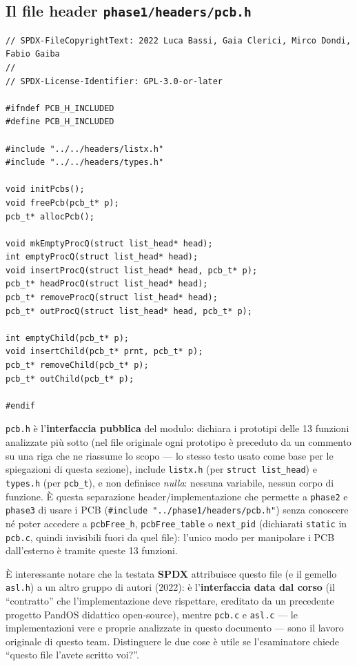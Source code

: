 \documentclass[11pt,a4paper]{article}
\newcommand{\code}[1]{\texttt{#1}}
\begin{document}
\subsection{Il file header \code{phase1/headers/pcb.h}}
\begin{lstlisting}
// SPDX-FileCopyrightText: 2022 Luca Bassi, Gaia Clerici, Mirco Dondi, Fabio Gaiba
//
// SPDX-License-Identifier: GPL-3.0-or-later

#ifndef PCB_H_INCLUDED
#define PCB_H_INCLUDED

#include "../../headers/listx.h"
#include "../../headers/types.h"

void initPcbs();
void freePcb(pcb_t* p);
pcb_t* allocPcb();

void mkEmptyProcQ(struct list_head* head);
int emptyProcQ(struct list_head* head);
void insertProcQ(struct list_head* head, pcb_t* p);
pcb_t* headProcQ(struct list_head* head);
pcb_t* removeProcQ(struct list_head* head);
pcb_t* outProcQ(struct list_head* head, pcb_t* p);

int emptyChild(pcb_t* p);
void insertChild(pcb_t* prnt, pcb_t* p);
pcb_t* removeChild(pcb_t* p);
pcb_t* outChild(pcb_t* p);

#endif
\end{lstlisting}
\code{pcb.h} è l'\textbf{interfaccia pubblica} del modulo: dichiara i
prototipi delle 13 funzioni analizzate più sotto (nel file originale ogni
prototipo è preceduto da un commento su una riga che ne riassume lo scopo
--- lo stesso testo usato come base per le spiegazioni di questa sezione),
include \code{listx.h} (per \code{struct list\_head}) e \code{types.h}
(per \code{pcb\_t}), e non definisce \emph{nulla}: nessuna variabile,
nessun corpo di funzione. \`E questa separazione header/implementazione
che permette a \code{phase2} e \code{phase3} di usare i PCB
(\code{\#include "../phase1/headers/pcb.h"}) senza conoscere né poter
accedere a \code{pcbFree\_h}, \code{pcbFree\_table} o \code{next\_pid}
(dichiarati \code{static} in \code{pcb.c}, quindi invisibili fuori da quel
file): l'unico modo per manipolare i PCB dall'esterno è tramite queste 13
funzioni.

\`E interessante notare che la testata \textbf{SPDX} attribuisce questo
file (e il gemello \code{asl.h}) a un altro gruppo di autori (2022): è
l'\textbf{interfaccia data dal corso} (il ``contratto'' che l'implementazione
deve rispettare, ereditato da un precedente progetto PandOS didattico
open-source), mentre \code{pcb.c} e \code{asl.c} --- le implementazioni
vere e proprie analizzate in questo documento --- sono il lavoro originale
di questo team. Distinguere le due cose è utile se l'esaminatore chiede
``questo file l'avete scritto voi?''.
\end{document}
